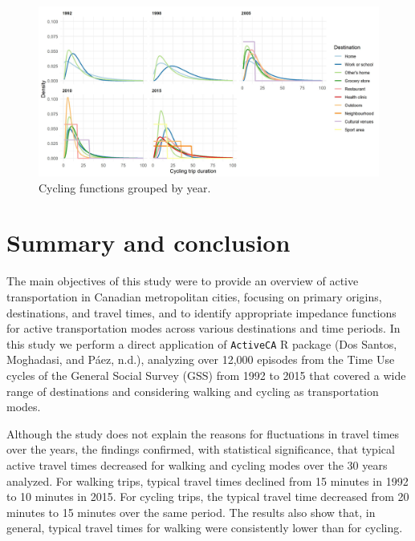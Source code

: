 \documentclass[preprint, 3p,
authoryear]{elsarticle} %
\begin{document}
\begin{figure}

{\centering \includegraphics[width=1\linewidth]{figures/cycling_functions_by_year} 

}

\caption{Cycling functions grouped by year.}\label{fig:cycling-function-by-year-fig}
\end{figure}

\hypertarget{summary-and-conclusion}{%
\section{Summary and conclusion}\label{summary-and-conclusion}}

The main objectives of this study were to provide an overview of active
transportation in Canadian metropolitan cities, focusing on primary
origins, destinations, and travel times, and to identify appropriate
impedance functions for active transportation modes across various
destinations and time periods. In this study we perform a direct
application of \texttt{ActiveCA} R package (Dos Santos, Moghadasi, and
Páez, n.d.), analyzing over 12,000 episodes from the Time Use cycles of
the General Social Survey (GSS) from 1992 to 2015 that covered a wide
range of destinations and considering walking and cycling as
transportation modes.

Although the study does not explain the reasons for fluctuations in
travel times over the years, the findings confirmed, with statistical
significance, that typical active travel times decreased for walking and
cycling modes over the 30 years analyzed. For walking trips, typical
travel times declined from 15 minutes in 1992 to 10 minutes in 2015. For
cycling trips, the typical travel time decreased from 20 minutes to 15
minutes over the same period. The results also show that, in general,
typical travel times for walking were consistently lower than for
cycling.
\end{document}
